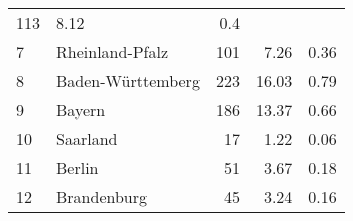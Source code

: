 \begin{longtable}{lXrrr}
       \num{113} &
       \num[round-mode=places,round-precision=2]{8.12} &
         \num[round-mode=places,round-precision=2]{0.4} \\

     7 &
     \multicolumn{1}{X}{ Rheinland-Pfalz   } &


       \num{101} &
       \num[round-mode=places,round-precision=2]{7.26} &
         \num[round-mode=places,round-precision=2]{0.36} \\

     8 &
     \multicolumn{1}{X}{ Baden-Württemberg   } &


       \num{223} &
       \num[round-mode=places,round-precision=2]{16.03} &
         \num[round-mode=places,round-precision=2]{0.79} \\

     9 &
     \multicolumn{1}{X}{ Bayern   } &


       \num{186} &
       \num[round-mode=places,round-precision=2]{13.37} &
         \num[round-mode=places,round-precision=2]{0.66} \\

     10 &
     \multicolumn{1}{X}{ Saarland   } &


       \num{17} &
       \num[round-mode=places,round-precision=2]{1.22} &
         \num[round-mode=places,round-precision=2]{0.06} \\

     11 &
     \multicolumn{1}{X}{ Berlin   } &


       \num{51} &
       \num[round-mode=places,round-precision=2]{3.67} &
         \num[round-mode=places,round-precision=2]{0.18} \\

     12 &
     \multicolumn{1}{X}{ Brandenburg   } &


       \num{45} &
       \num[round-mode=places,round-precision=2]{3.24} &
         \num[round-mode=places,round-precision=2]{0.16} \\


\end{longtable}
